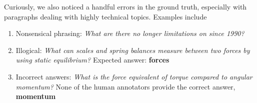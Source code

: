 \documentclass{article}
\begin{document}
Curiously, we also noticed a handful errors in the ground truth, especially with paragraphs dealing with highly technical topics. Examples include

\begin{enumerate}
\item Nonsensical phrasing: \textit{What are there no longer limitations on since 1990?}
\item Illogical: \textit{What can scales and spring balances measure between two forces by using static equilibrium?} Expected answer: \textbf{forces}
\item Incorrect answers: \textit{What is the force equivalent of torque compared to angular momentum?}  None of the human annotators provide the correct answer, \textbf{momentum}
\end{enumerate}
\end{document}
